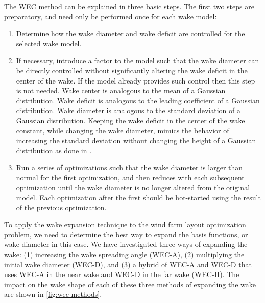 \documentclass{jpconf}
\begin{document}
The WEC method can be explained in three basic steps. The first two steps are preparatory, and need only be performed once for each wake model:
\begin{enumerate}[label=\arabic*)]
	\item Determine how the wake diameter and wake deficit are controlled for the selected wake model.
    \item If necessary, introduce a factor to the model such that the wake diameter can be directly controlled without significantly altering the wake deficit in the center of the wake. If the model already provides such control then this step is not needed. Wake center is analogous to the mean of a Gaussian distribution. Wake deficit is analogous to the leading coefficient of a Gaussian distribution. Wake diameter is analogous to the standard deviation of a Gaussian distribution.  Keeping the wake deficit in the center of the wake constant, while changing the wake diameter, mimics the behavior of increasing the standard deviation without changing the height of a Gaussian distribution as done in \cite{mobahi2015}. 
    \item Run a series of optimizations such that the wake diameter is larger than normal for the first optimization, and then reduces with each subsequent optimization until the wake diameter is no longer altered from the original model. Each optimization after the first should be hot-started using the result of the previous optimization.
    
\end{enumerate}

To apply the wake expansion technique to the wind farm layout optimization problem, we need to determine the best way to expand the basis functions, or wake diameter in this case. We have investigated three ways of expanding the wake: (1) increasing the wake spreading angle (WEC-A), (2) multiplying the initial wake diameter (WEC-D), and (3) a hybrid of WEC-A and WEC-D that uses WEC-A in the near wake and WEC-D in the far wake (WEC-H). The impact on the wake shape of each of these three methods of expanding the wake are shown in \cref{fig:wec-methods}.
\end{document}
